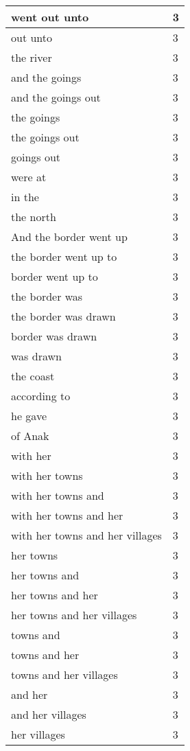 \begin{center}
\begin{longtable}{|p{3.0in}|p{0.5in}|}
went out unto & 3\\ \hline 
out unto & 3\\ \hline 
the river & 3\\ \hline 
and the goings & 3\\ \hline 
and the goings out & 3\\ \hline 
the goings & 3\\ \hline 
the goings out & 3\\ \hline 
goings out & 3\\ \hline 
were at & 3\\ \hline 
in the & 3\\ \hline 
the north & 3\\ \hline 
And the border went up & 3\\ \hline 
the border went up to & 3\\ \hline 
border went up to & 3\\ \hline 
the border was & 3\\ \hline 
the border was drawn & 3\\ \hline 
border was drawn & 3\\ \hline 
was drawn & 3\\ \hline 
the coast & 3\\ \hline 
according to & 3\\ \hline 
he gave & 3\\ \hline 
of Anak & 3\\ \hline 
with her & 3\\ \hline 
with her towns & 3\\ \hline 
with her towns and & 3\\ \hline 
with her towns and her & 3\\ \hline 
with her towns and her villages & 3\\ \hline 
her towns & 3\\ \hline 
her towns and & 3\\ \hline 
her towns and her & 3\\ \hline 
her towns and her villages & 3\\ \hline 
towns and & 3\\ \hline 
towns and her & 3\\ \hline 
towns and her villages & 3\\ \hline 
and her & 3\\ \hline 
and her villages & 3\\ \hline 
her villages & 3\\ \hline 
\end{longtable}
\end{center}





